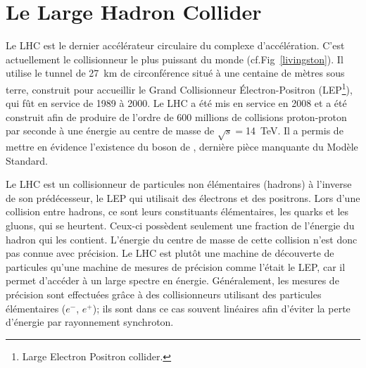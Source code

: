 \section{Le Large Hadron Collider}
Le LHC est le dernier accélérateur circulaire du complexe d'accélération. C'est actuellement le collisionneur le plus puissant du monde (cf.Fig~\ref{livingston}). Il utilise le tunnel de \SI{27}{\kilo\meter} de circonférence situé à une centaine de mètres sous terre, construit pour accueillir le Grand Collisionneur Électron-Positron (LEP\footnote{Large Electron Positron collider.}), qui fût en service de \num{1989} à \num{2000}. Le LHC a été mis en service en \num{2008} et a été construit afin de produire de l'ordre de \num{600} millions de collisions proton-proton par seconde à une énergie au centre de masse de $\sqrt{s}=$\SI{14}{\tera\eV}. Il a permis de mettre en évidence l'existence du boson de , dernière pièce manquante du Modèle Standard.

Le LHC est un collisionneur de particules non élémentaires (hadrons) à l'inverse de son prédécesseur, le LEP qui utilisait des électrons et des positrons. Lors d'une collision entre hadrons, ce sont leurs constituants élémentaires, les quarks et les gluons, qui se heurtent. Ceux-ci possèdent seulement une fraction de l'énergie du hadron qui les contient. L'énergie du centre de masse de cette collision n'est donc pas connue avec précision. Le LHC est plutôt une machine de découverte de particules qu'une machine de mesures de précision comme l'était le LEP, car il permet d'accéder à un large spectre en énergie. Généralement, les mesures de précision sont effectuées grâce à des collisionneurs utilisant des particules élémentaires ($e^{-}$, $e^{+}$); ils sont dans ce cas souvent linéaires afin d'éviter la perte d'énergie par rayonnement synchroton.

